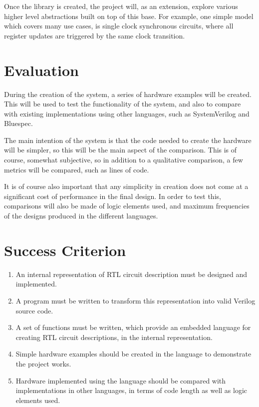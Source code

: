 Once the library is created, the project will, as an 
extension, explore various higher level abstractions built 
on top of this base.  For example, one simple model which 
covers many use cases, is single clock synchronous circuits, 
where all register updates are triggered by the same clock 
transition.

\section*{Evaluation}

During the creation of the system, a series of hardware 
examples will be created. This will be used to test the 
functionality of the system, and also to compare with 
existing implementations using other languages, such as 
SystemVerilog and Bluespec.

The main intention of the system is that the code needed to 
create the hardware will be simpler, so this will be the 
main aspect of the comparison. This is of course, somewhat 
subjective, so in addition to a qualitative comparison, a 
few metrics will be compared, such as lines of code.

It is of course also important that any simplicity in 
creation does not come at a significant cost of performance 
in the final design. In order to test this, comparisons will 
also be made of logic elements used, and maximum frequencies 
of the designs produced in the different languages.

\section*{Success Criterion}

\begin{enumerate}

\item
An internal representation of RTL circuit description must 
be designed and implemented.

\item
A program must be written to transform this representation 
into valid Verilog source code.

\item
A set of functions must be written, which provide an 
embedded language for creating RTL circuit descriptions, in 
the internal representation.

\item
Simple hardware examples should be created in the language 
to demonstrate the project works.

\item
Hardware implemented using the language should be compared 
with implementations in other languages, in terms of code 
length as well as logic elements used.

\end{enumerate}

